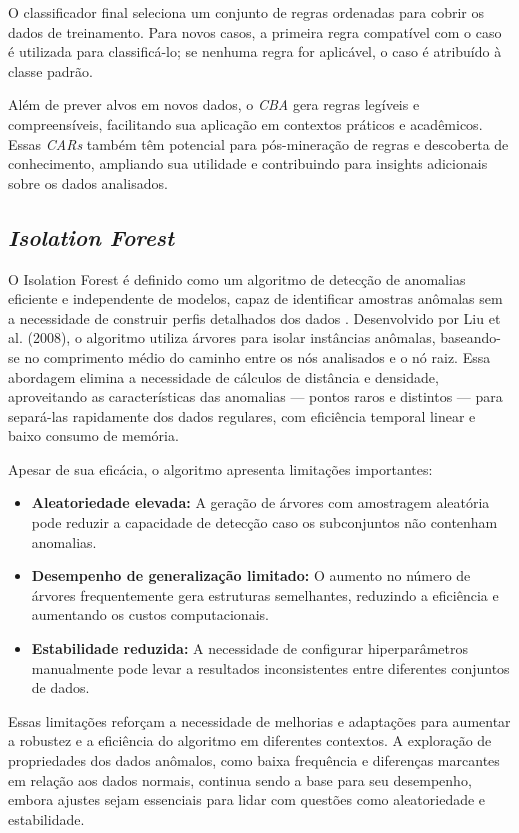 \documentclass[12pt,a4paper]{article}
\begin{document}
O classificador final seleciona um conjunto de regras ordenadas para cobrir os dados de treinamento. Para novos casos, a primeira regra compatível com o caso é utilizada para classificá-lo; se nenhuma regra for aplicável, o caso é atribuído à classe padrão.

Além de prever alvos em novos dados, o \textit{CBA} gera regras legíveis e compreensíveis, facilitando sua aplicação em contextos práticos e acadêmicos. Essas \textit{CARs} também têm potencial para pós-mineração de regras e descoberta de conhecimento, ampliando sua utilidade e contribuindo para insights adicionais sobre os dados analisados.

\subsection{\textit{Isolation Forest}}

O Isolation Forest é definido como um algoritmo de detecção de anomalias eficiente e independente de modelos, capaz de identificar amostras anômalas sem a necessidade de construir perfis detalhados dos dados \cite{chen2023}. Desenvolvido por Liu et al. (2008), o algoritmo utiliza árvores para isolar instâncias anômalas, baseando-se no comprimento médio do caminho entre os nós analisados e o nó raiz. Essa abordagem elimina a necessidade de cálculos de distância e densidade, aproveitando as características das anomalias — pontos raros e distintos — para separá-las rapidamente dos dados regulares, com eficiência temporal linear e baixo consumo de memória.

Apesar de sua eficácia, o algoritmo apresenta limitações importantes:
\begin{itemize}
    \item \textbf{Aleatoriedade elevada:} A geração de árvores com amostragem aleatória pode reduzir a capacidade de detecção caso os subconjuntos não contenham anomalias.
    \item \textbf{Desempenho de generalização limitado:} O aumento no número de árvores frequentemente gera estruturas semelhantes, reduzindo a eficiência e aumentando os custos computacionais.
    \item \textbf{Estabilidade reduzida:} A necessidade de configurar hiperparâmetros manualmente pode levar a resultados inconsistentes entre diferentes conjuntos de dados.
\end{itemize}

Essas limitações reforçam a necessidade de melhorias e adaptações para aumentar a robustez e a eficiência do algoritmo em diferentes contextos. A exploração de propriedades dos dados anômalos, como baixa frequência e diferenças marcantes em relação aos dados normais, continua sendo a base para seu desempenho, embora ajustes sejam essenciais para lidar com questões como aleatoriedade e estabilidade.
\end{document}
